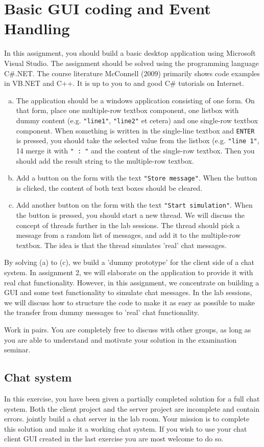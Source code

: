 \documentclass{article}
\begin{document}
\section{Basic GUI coding and Event Handling}
In this assignment, you should build a basic desktop application using Microsoft Visual Studio. The assignment should be solved using the programming language C\#.NET. The course literature McConnell (2009) primarily shows code examples in VB.NET and C++. It is up to you to and good C\# tutorials on Internet.
\begin{enumerate}[a)]
  \item The application should be a windows application consisting of one form. On that form, place one multiple-row textbox component, one listbox with dummy content (e.g. \texttt{"line1"}, \texttt{"line2"} et cetera) and one single-row textbox component. When something is written in the single-line textbox and \texttt{ENTER} is pressed, you should take the selected value from the listbox (e.g. \texttt{"line 1"}, 14 merge it with \texttt{" : "} and the content of the single-row textbox. Then you should add the result string to the multiple-row textbox.
  \item Add a button on the form with the text \texttt{"Store message"}. When the button is clicked, the content of both text boxes should be cleared.
  \item Add another button on the form with the text \texttt{"Start simulation"}. When the button is pressed, you should start a new thread. We will discuss the concept of threads further in the lab sessions. The thread should pick a message from a random list of messages, and add it to the multiple-row textbox. The idea is that the thread simulates 'real' chat messages.
\end{enumerate}
By solving (a) to (c), we build a 'dummy prototype' for the client side of a chat system. In assignment 2, we will elaborate on the application to provide it with real chat functionality. However, in this assignment, we concentrate on building a GUI and some test functionality to simulate chat messages. In the lab sessions, we will discuss how to structure the code to make it as easy as possible to make the transfer from dummy messages to 'real' chat functionality.

Work in pairs. You are completely free to discuss with other groups, as long as you are able to understand and motivate your solution in the examination seminar.
\subsection{Chat system}
In this exercise, you have been given a partially completed solution for a full chat system. Both the client project and the server project are incomplete and contain errors. jointly build a chat server in the lab room. Your mission is to complete this solution and make it a working chat system. If you wish to use your chat client GUI created in the last exercise you are most welcome to do so.
\end{document}
